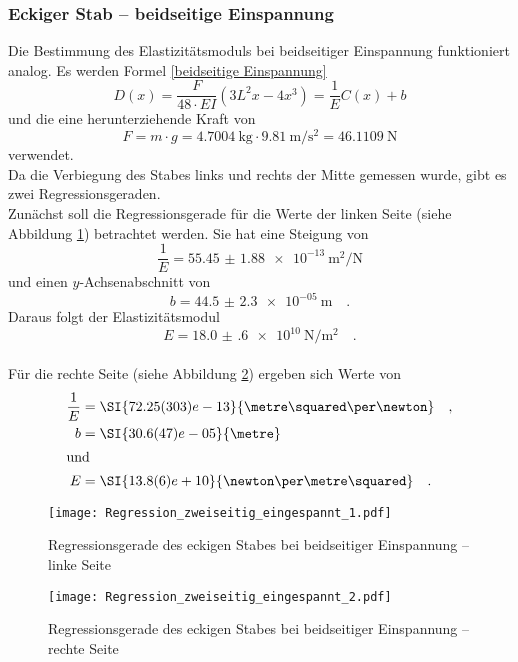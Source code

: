 \subsubsection{Eckiger Stab -- beidseitige Einspannung}
Die Bestimmung des Elastizitätsmoduls bei beidseitiger Einspannung funktioniert analog. Es werden Formel \eqref{beidseitige Einspannung}
\begin{equation*}
	D(x) = \frac{F}{48\cdot E I}\left(3L^2x-4x^3\right) = \frac{1}{E}C(x)+b
\end{equation*}
und die eine herunterziehende Kraft von
\begin{equation}
  F = m \cdot g = \SI{4.7004}{\kilo\gram} \cdot \SI{9.81}{\metre\per\second\squared} = \SI{46.1109}{\newton}
\end{equation}
verwendet. \\
Da die Verbiegung des Stabes links und rechts der Mitte gemessen wurde, gibt es zwei Regressionsgeraden. \\
Zunächst soll die Regressionsgerade für die Werte der linken Seite (siehe Abbildung \ref{fig:linkeseite}) betrachtet werden. Sie hat eine Steigung von
\begin{equation}
  \frac{1}{E}= \SI{55.45(188)e-13}{\metre\squared\per\newton}
\end{equation}
und einen $y$-Achsenabschnitt von
\begin{equation}
  b = \SI{44.5(23)e-05}{\metre} \quad.
\end{equation}
Daraus folgt der Elastizitätsmodul
\begin{equation}
  E = \SI{18.0(6)e+10}{\newton\per\metre\squared} \quad.
\end{equation}
\\
Für die rechte Seite (siehe Abbildung \ref{fig:rechteseite}) ergeben sich Werte von
\begin{align}
  \frac{1}{E} &= \SI{72.25(303)e-13}{\metre\squared\per\newton} \quad,\\
  b &= \SI{30.6(47)e-05}{\metre} \\
  \intertext{und}
  E &= \SI{13.8(6)e+10}{\newton\per\metre\squared} \quad.
\end{align}


\begin{figure}[t!]
  \centering
\texttt{[image: Regression\_zweiseitig\_eingespannt\_1.pdf]}
\caption{Regressionsgerade des eckigen Stabes bei beidseitiger Einspannung -- linke Seite}
\label{fig:linkeseite}
\end{figure}

\begin{figure}[b!]
  \centering
\texttt{[image: Regression\_zweiseitig\_eingespannt\_2.pdf]}
\caption{Regressionsgerade des eckigen Stabes bei beidseitiger Einspannung -- rechte Seite}
\label{fig:rechteseite}
\end{figure}

\clearpage
